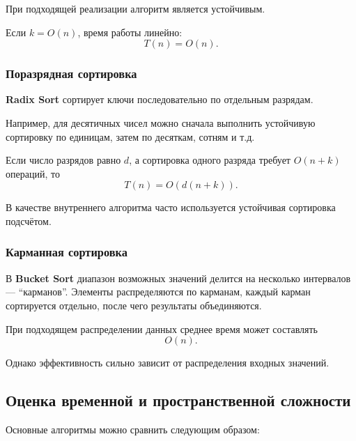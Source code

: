 При подходящей реализации алгоритм является устойчивым.

Если $k=O(n)$, время работы линейно:
\[
T(n)=O(n).
\]


\subsubsection*{Поразрядная сортировка}

\textbf{Radix Sort} сортирует ключи последовательно по отдельным разрядам.

Например, для десятичных чисел можно сначала выполнить устойчивую сортировку
по единицам, затем по десяткам, сотням и т.д.

Если число разрядов равно $d$, а сортировка одного разряда требует
$O(n+k)$ операций, то
\[
T(n)=O(d(n+k)).
\]

В качестве внутреннего алгоритма часто используется устойчивая сортировка
подсчётом.


\subsubsection*{Карманная сортировка}

В \textbf{Bucket Sort} диапазон возможных значений делится на несколько
интервалов --- ``карманов''. Элементы распределяются по карманам, каждый
карман сортируется отдельно, после чего результаты объединяются.

При подходящем распределении данных среднее время может составлять
\[
O(n).
\]

Однако эффективность сильно зависит от распределения входных значений.


\subsection{Оценка временной и пространственной сложности}

Основные алгоритмы можно сравнить следующим образом:

